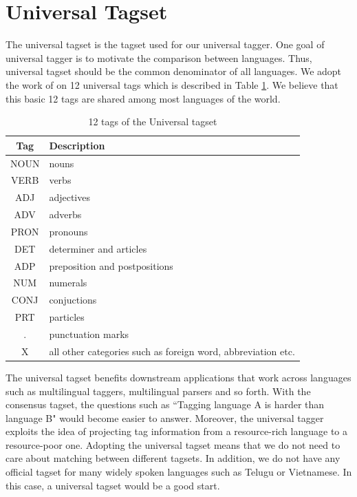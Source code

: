 \section{Universal Tagset}
The universal tagset is the tagset used for our universal tagger. One goal of universal tagger is to motivate the comparison between languages. Thus, universal tagset should be the common denominator of all languages. We adopt the work of \cite{UniversalTagSet} on 12 universal tags which is described in Table \ref{tab:univesalTagset}. We believe that this basic 12 tags are shared among most languages of the world. 
\begin{table}
  \centering
    \begin{tabular}{|c|p{12cm}|}
    \hline
	Tag & Description\\
	\hline \hline
	NOUN & nouns \\
	VERB & verbs\\
	ADJ & adjectives \\
	ADV & adverbs \\
	PRON & pronouns \\
	DET & determiner and articles \\
	ADP & preposition and postpositions\\
	NUM & numerals \\
	CONJ & conjuctions \\
	PRT & particles \\
	. & punctuation marks \\
	X & all other categories such as foreign word, abbreviation etc.\\
	\hline
    \end{tabular}
  \caption{12 tags of the Universal tagset  }    
  \label{tab:univesalTagset}%
\end{table}%
The universal tagset benefits downstream applications that work across languages such as multilingual taggers, multilingual parsers and so forth. With the consensus tagset, the questions such as ``Tagging language A is harder than language B" would become easier to answer. Moreover, the universal tagger exploits the idea of projecting tag information from a resource-rich language to a resource-poor one. Adopting the universal tagset means that we do not need to care about matching between different tagsets. In addition, we do not have any official tagset for many widely spoken languages such as Telugu or Vietnamese. In this case, a universal tagset would be a good start. 

